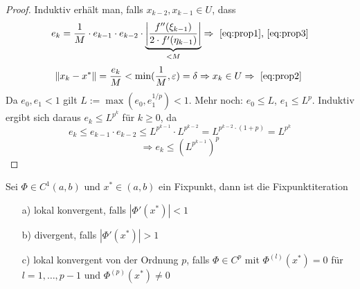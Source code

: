 \begin{proof}
Induktiv erhält man, falls $x_{k-2},x_{k-1}\in U$, dass
\[
  e_k=\frac{1}{M}\cdot e_{k-1}\cdot e_{k-2}\cdot \underset{<M}{\underbrace{\left|\frac{f''(\xi_{k-1})}{2\cdot
  f'(\eta_{k-1})}\right|}} \Rightarrow \mbox{ \eqref{eq:prop1}, \eqref{eq:prop3}}
\]
\[
  \|x_k-x^*\|=\frac{e_k}{M}<\min(\frac{1}{M},\varepsilon)=\delta\Rightarrow
x_k\in U\Rightarrow \mbox{ \eqref{eq:prop2} }
\]
Da $e_0,e_1<1$ gilt $L:=\max(e_0,e_1^{1/p})<1$. Mehr noch: $e_0\leq L$,
$e_1\leq L^p$. Induktiv ergibt sich daraus $e_k\leq L^{p^k}$ für $k\geq 0$, %
da
\[
  e_k\leq e_{k-1}\cdot e_{k-2}\leq L^{p^{k-1}}\cdot L^{p^{k-2}}=L^{p^{k-2}\cdot
(1+p)} = L^{p^k}
\]\[
  \Rightarrow e_k\leq (L^{p^{k-1}})^p
\]
\end{proof}


\begin{lemma}
\label{lem:kvg-ord}
\noindent Sei $\Phi \in C^1(a,b)$ und $x^*\in (a,b)$ ein Fixpunkt, dann ist die Fixpunktiteration
\begin{enumerate}
\item[a)] lokal konvergent, falls $|\Phi'(x^*)|<1$
\item[b)] divergent, falls $|\Phi'(x^*)|>1$
\item[c)] lokal konvergent von der Ordnung $p$, falls
  $\Phi\in C^p$ mit $\Phi^{(l)}(x^*)=0$ für $l=1,\ldots ,p-1$
  und $\Phi^{(p)}(x^*)\neq 0$
\end{enumerate}
\end{lemma}

